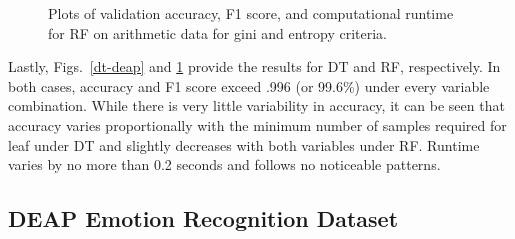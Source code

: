\documentclass[12pt]{uthesis-v12}  %
\begin{document}
\begin{figure}
	\hfill	
{}
						
\caption{Plots of validation accuracy, F1 score, and computational runtime for RF on arithmetic data for gini and entropy criteria.}
	\label{rfr-deap}
	\end{figure}
	
Lastly, Figs.~\ref{dt-deap} and \ref{rfr-deap} provide the results for DT and RF, respectively. In both cases, accuracy and F1 score exceed .996 (or 99.6\%) under every variable combination. While there is very little variability in accuracy, it can be seen that accuracy varies proportionally with the minimum number of samples required for leaf under DT and slightly decreases with both variables under RF. Runtime varies by no more than 0.2 seconds and follows no noticeable patterns. 

\subsection{DEAP Emotion Recognition Dataset}
\end{document}
